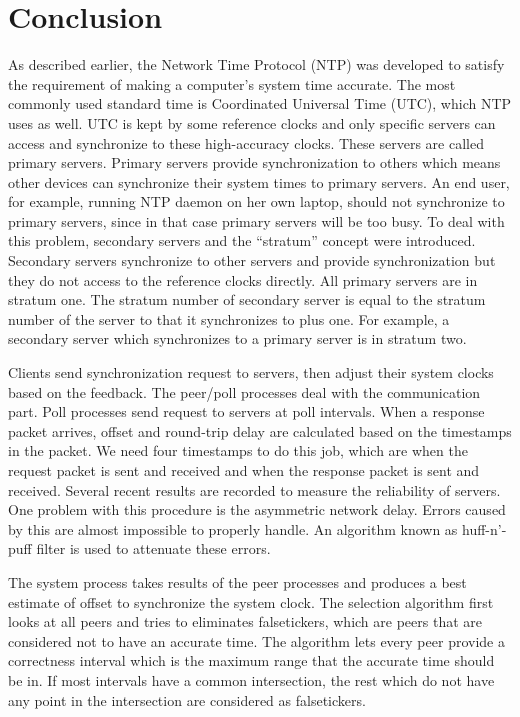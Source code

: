 
\chapter{Conclusion}
\label{cha:conclusion}

As described earlier, the Network Time Protocol (NTP) was developed to satisfy the
requirement of making a computer's system time accurate. The most commonly used
standard time is Coordinated Universal Time (UTC), which NTP uses as well.
UTC is kept by some reference clocks and only specific servers can access and
synchronize to these high-accuracy clocks. These servers are called primary
servers. Primary servers
provide synchronization to others which means other devices can synchronize
their system times to primary servers. An end user, for example, 
running NTP daemon on her own laptop, should not synchronize to
primary servers, since in that case primary servers will be too busy. To deal
with this problem, secondary servers and the ``stratum'' concept were
introduced.
Secondary servers synchronize to other servers and provide synchronization but
they do not access to the reference clocks directly.   All primary servers are
in stratum one. The stratum number of
secondary server is equal to the stratum number of the server to that it synchronizes
to plus one. For example, a secondary server which synchronizes to a primary
server is in stratum two. 

Clients send synchronization request to servers, then adjust their
system clocks based on the feedback. The peer/poll processes deal with the
communication part. Poll processes send request to servers at poll intervals.
When a response packet arrives, offset and round-trip delay are calculated
based on the timestamps in the packet. We need four timestamps to do this job,
which are when the request packet is sent and received and when the response
packet is sent and received. Several recent results are recorded to measure
the reliability of servers. One problem with this procedure is the asymmetric
network delay.  Errors caused by this are almost impossible to properly handle.
An algorithm known as huff-n'-puff filter is used to attenuate these errors.

The system process takes results of the peer processes and produces a best
estimate of offset to synchronize the system clock. The selection algorithm
first looks at all peers and tries to eliminates falsetickers, which are peers
that are considered not to have an accurate time. The algorithm lets every peer
provide a correctness interval which is the maximum range that the accurate
time should be in. If most intervals have a common intersection, the rest which
do not have any point in the intersection are considered as falsetickers. 

